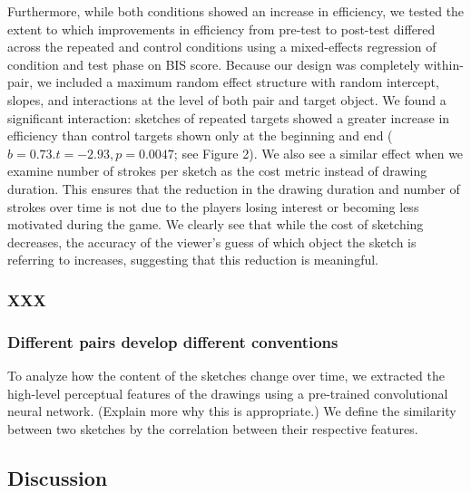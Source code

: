 \documentclass[10pt,letterpaper]{article}
\begin{document}
Furthermore, while both conditions showed an increase in efficiency, we tested the extent to which improvements in efficiency from pre-test to post-test differed across the repeated and control conditions using a mixed-effects regression of condition and test phase on BIS score. Because our design was completely within-pair, we included a maximum random effect structure with random intercept, slopes, and interactions at the level of both pair and target object. We found a significant interaction: sketches of repeated targets showed a greater increase in efficiency than control targets shown only at the beginning and end ($b = 0.73. t = -2.93, p = 0.0047$; see Figure 2). We also see a similar effect when we examine number of strokes per sketch as the cost metric instead of drawing duration. This ensures that the reduction in the drawing duration and number of strokes over time is not due to the players losing interest or becoming less motivated during the game. We clearly see that while the cost of sketching decreases, the accuracy of the viewer's guess of which object the sketch is referring to increases, suggesting that this reduction is meaningful. 





\subsubsection{XXX}

\subsubsection{Different pairs develop different conventions} To analyze how the content of the sketches change over time, we extracted the high-level perceptual features of the drawings using a pre-trained convolutional neural network. (Explain more why this is appropriate.) We define the similarity between two sketches by the correlation between their respective features.%


\subsection{Discussion}
\end{document}
